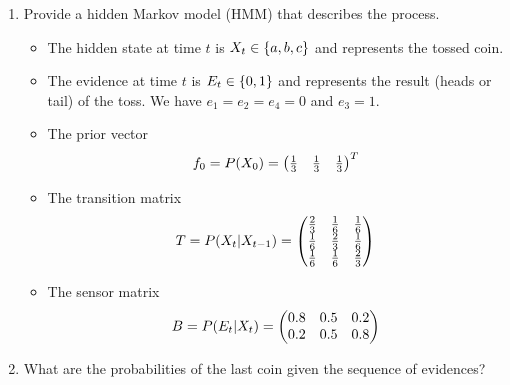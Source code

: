 \documentclass[11pt, a4paper]{article}
\begin{document}
\begin{enumerate}
    \item Provide a hidden Markov model (HMM) that describes the process.

    \begin{solution}
        \begin{itemize}
            \item The hidden state at time $t$ is $X_t \in \{a, b, c\}$ and represents the tossed coin.

            \item The evidence at time $t$ is $E_t \in \{0, 1\}$ and represents the result (heads or tail) of the toss. We have $e_1 = e_2 = e_4 = 0$ and $e_3 = 1$.

            \item The prior vector
                \begin{equation*}
                    f_0 = P(X_0) = \begin{pmatrix}\frac{1}{3} & \frac{1}{3} & \frac{1}{3}\end{pmatrix}^T
                \end{equation*}

            \item The transition matrix
                \begin{equation*}
                    T = P(X_t \vert X_{t-1}) = \begin{pmatrix}
                        \frac{2}{3} & \frac{1}{6} & \frac{1}{6} \\
                        \frac{1}{6} & \frac{2}{3} & \frac{1}{6} \\
                        \frac{1}{6} & \frac{1}{6} & \frac{2}{3}
                    \end{pmatrix}
                \end{equation*}

            \item The sensor matrix
                \begin{equation*}
                    B = P(E_t \vert X_t) = \begin{pmatrix}
                        0.8 & 0.5 & 0.2 \\
                        0.2 & 0.5 & 0.8
                    \end{pmatrix}
                \end{equation*}
        \end{itemize}
    \end{solution}

    \item What are the probabilities of the last coin given the sequence of evidences?


\end{enumerate}
\end{document}
